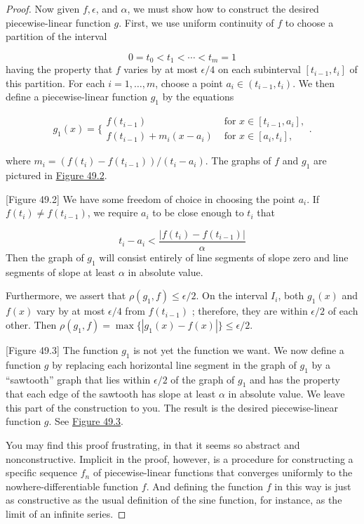 \begin{proof}
Now given \(f,\epsilon\), and \(\alpha\), we must show how to construct the desired piecewise-linear function \(g\). First, we use uniform continuity of \(f\) to choose a partition of the interval

\[
0 = t_{0} < t_{1} < \cdots < t_{m} = 1
\]
having the property that \(f\) varies by at most \(\epsilon /4\) on each subinterval \([ {t_{i - 1},t_{i}}]\) of this partition. For each \(i = 1,\ldots, m\), choose a point \(a_{i} \in ({t_{i - 1},t_{i}})\). We then define a piecewise-linear function \(g_{1}\) by the equations

\[
g_{1}(x) = \{ \begin{array}{ll} f(t_{i - 1}) & \text{ for }x \in [ {t_{i - 1},a_{i}}] , \\ f(t_{i - 1}) + m_{i}({x - a_{i}}) & \text{ for }x \in [ {a_{i},t_{i}}] , \end{array}.
\]

where \(m_{i} = ({f(t_{i}) - f(t_{i - 1}) }) /({t_{i} - a_{i}})\). The graphs of \(f\) and \(g_{1}\) are pictured in \hyperref[fig:49.2]{Figure 49.2}.

[Figure 49.2]
We have some freedom of choice in choosing the point \(a_{i}\). If \(f(t_{i}) \neq f(t_{i - 1})\), we require \(a_{i}\) to be close enough to \(t_{i}\) that

\[
t_{i} - a_{i} < \frac{| f(t_{i}) - f(t_{i - 1}) | }{\alpha }
\]
Then the graph of \(g_{1}\) will consist entirely of line segments of slope zero and line segments of slope at least \(\alpha\) in absolute value.

Furthermore, we assert that \(\rho ({g_{1},f}) \leq \epsilon /2\). On the interval \(I_{i}\), both \(g_{1}(x)\) and \(f(x)\) vary by at most \(\epsilon /4\) from \(f(t_{i - 1})\) ; therefore, they are within \(\epsilon /2\) of each other. Then \(\rho ({g_{1},f}) = \max \{ | {g_{1}(x) - f(x) }| \} \leq \epsilon /2\).

[Figure 49.3]
The function \(g_{1}\) is not yet the function we want. We now define a function \(g\) by replacing each horizontal line segment in the graph of \(g_{1}\) by a ``sawtooth'' graph that lies within \(\epsilon /2\) of the graph of \(g_{1}\) and has the property that each edge of the sawtooth has slope at least \(\alpha\) in absolute value. We leave this part of the construction to you. The result is the desired piecewise-linear function \(g\). See \hyperref[fig:49.3]{Figure 49.3}.

You may find this proof frustrating, in that it seems so abstract and nonconstructive. Implicit in the proof, however, is a procedure for constructing a specific sequence \(f_{n}\) of piecewise-linear functions that converges uniformly to the nowhere-differentiable function \(f\). And defining the function \(f\) in this way is just as constructive as the usual definition of the sine function, for instance, as the limit of an infinite series.
\end{proof}
